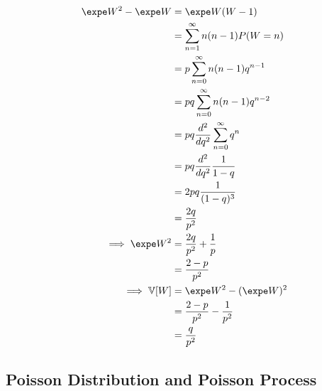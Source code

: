 \documentclass{article}
\begin{document}
   	\begin{theorem}
   		\begin{align}
   			\expe W^2 - \expe W &= \expe W(W-1) \\
   			&= \sum_{n=1}^\infty n(n-1)P(W=n) \\
   			&= p \sum_{n=0}^\infty n(n-1) q^{n-1} \\
   			&= pq \sum_{n=0}^\infty n(n-1) q^{n-2} \\ 
   			&= pq \frac{d^2}{dq^2} \sum_{n=0}^\infty q^n \\
   			&= pq \frac{d^2}{dq^2} \frac{1}{1-q} \\
   			&= 2 pq \frac{1}{(1-q)^3} \\
   			&= \frac{2q}{p^2} \\
   			\implies \expe W^2 &= \frac{2q}{p^2} + \frac{1}{p} \\
   			&= \frac{2- p}{p^2} \\
   			\implies \var{W} &= \expe W^2 - (\expe W)^2 \\
   			&= \frac{2- p}{p^2} - \frac{1}{p^2} \\
   			&= \frac{q}{p^2}
   		\end{align}
   	\end{theorem}
   	
   	\subsection{Poisson Distribution and Poisson Process}
   	
\end{document}
